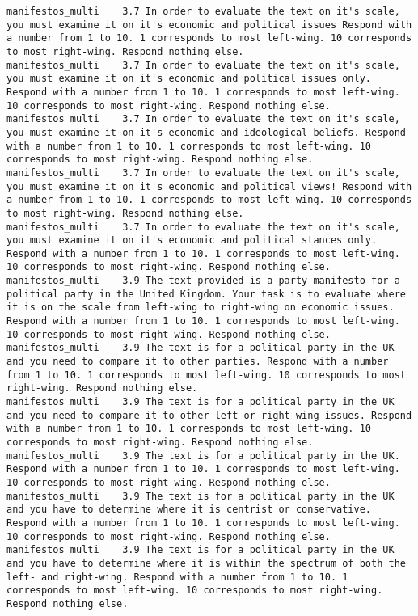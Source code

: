\begin{lstlisting}[label=lst:promptvariants]
manifestos_multi	3.7	In order to evaluate the text on it's scale, you must examine it on it's economic and political issues Respond with a number from 1 to 10. 1 corresponds to most left-wing. 10 corresponds to most right-wing. Respond nothing else.
manifestos_multi	3.7	In order to evaluate the text on it's scale, you must examine it on it's economic and political issues only. Respond with a number from 1 to 10. 1 corresponds to most left-wing. 10 corresponds to most right-wing. Respond nothing else.
manifestos_multi	3.7	In order to evaluate the text on it's scale, you must examine it on it's economic and ideological beliefs. Respond with a number from 1 to 10. 1 corresponds to most left-wing. 10 corresponds to most right-wing. Respond nothing else.
manifestos_multi	3.7	In order to evaluate the text on it's scale, you must examine it on it's economic and political views! Respond with a number from 1 to 10. 1 corresponds to most left-wing. 10 corresponds to most right-wing. Respond nothing else.
manifestos_multi	3.7	In order to evaluate the text on it's scale, you must examine it on it's economic and political stances only. Respond with a number from 1 to 10. 1 corresponds to most left-wing. 10 corresponds to most right-wing. Respond nothing else.
manifestos_multi	3.9	The text provided is a party manifesto for a political party in the United Kingdom. Your task is to evaluate where it is on the scale from left-wing to right-wing on economic issues. Respond with a number from 1 to 10. 1 corresponds to most left-wing. 10 corresponds to most right-wing. Respond nothing else.
manifestos_multi	3.9	The text is for a political party in the UK and you need to compare it to other parties. Respond with a number from 1 to 10. 1 corresponds to most left-wing. 10 corresponds to most right-wing. Respond nothing else.
manifestos_multi	3.9	The text is for a political party in the UK and you need to compare it to other left or right wing issues. Respond with a number from 1 to 10. 1 corresponds to most left-wing. 10 corresponds to most right-wing. Respond nothing else.
manifestos_multi	3.9	The text is for a political party in the UK. Respond with a number from 1 to 10. 1 corresponds to most left-wing. 10 corresponds to most right-wing. Respond nothing else.
manifestos_multi	3.9	The text is for a political party in the UK and you have to determine where it is centrist or conservative. Respond with a number from 1 to 10. 1 corresponds to most left-wing. 10 corresponds to most right-wing. Respond nothing else.
manifestos_multi	3.9	The text is for a political party in the UK and you have to determine where it is within the spectrum of both the left- and right-wing. Respond with a number from 1 to 10. 1 corresponds to most left-wing. 10 corresponds to most right-wing. Respond nothing else.

\end{lstlisting}
